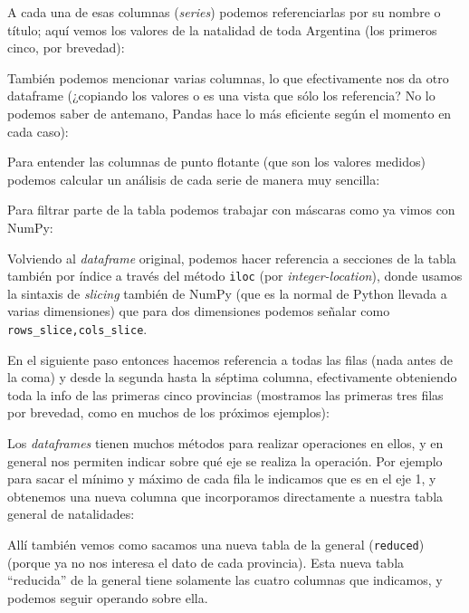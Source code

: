 A cada una de esas columnas (\textit{series}) podemos referenciarlas por su nombre o título; aquí vemos los valores de la natalidad de toda Argentina (los primeros cinco, por brevedad):


También podemos mencionar varias columnas, lo que efectivamente nos da otro dataframe (¿copiando los valores o es una vista que sólo los referencia? No lo podemos saber de antemano, Pandas hace lo más eficiente según el momento en cada caso):


Para entender las columnas de punto flotante (que son los valores medidos) podemos calcular un análisis de cada serie de manera muy sencilla:


Para filtrar parte de la tabla podemos trabajar con máscaras como ya vimos con NumPy:


Volviendo al \textit{dataframe} original, podemos hacer referencia a secciones de la tabla también por índice a través del método \texttt{iloc} (por \textit{integer-location}), donde usamos la sintaxis de \textit{slicing} también de NumPy (que es la normal de Python llevada a varias dimensiones) que para dos dimensiones podemos señalar como \texttt{rows\_slice,cols\_slice}.

En el siguiente paso entonces hacemos referencia a todas las filas (nada antes de la coma) y desde la segunda hasta la séptima columna, efectivamente obteniendo toda la info de las primeras cinco provincias (mostramos las primeras tres filas por brevedad, como en muchos de los próximos ejemplos):


Los \textit{dataframes} tienen muchos métodos para realizar operaciones en ellos, y en general nos permiten indicar sobre qué eje se realiza la operación. Por ejemplo para sacar el mínimo y máximo de cada fila le indicamos que es en el eje 1, y obtenemos una nueva columna que incorporamos directamente a nuestra tabla general de natalidades:


Allí también vemos como sacamos una nueva tabla de la general (\texttt{reduced}) (porque ya no nos interesa el dato de cada provincia). Esta nueva tabla ``reducida'' de la general tiene solamente las cuatro columnas que indicamos, y podemos seguir operando sobre ella.

